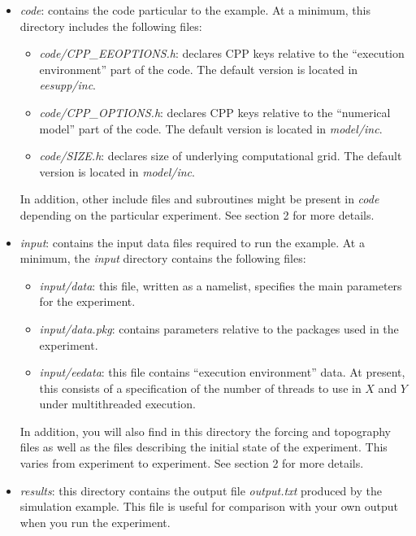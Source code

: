 \begin{itemize}
\item \textit{code}: contains the code particular to the example. At a
minimum, this directory includes the following files:

\begin{itemize}
\item \textit{code/CPP\_EEOPTIONS.h}: declares CPP keys relative to the
``execution environment'' part of the code. The default version is located
in \textit{eesupp/inc}.

\item \textit{code/CPP\_OPTIONS.h}: declares CPP keys relative to the
``numerical model'' part of the code. The default version is located in 
\textit{model/inc}.

\item \textit{code/SIZE.h}: declares size of underlying computational grid.
The default version is located in \textit{model/inc}.
\end{itemize}

In addition, other include files and subroutines might be present in \textit{%
code} depending on the particular experiment. See section 2 for more details.

\item \textit{input}: contains the input data files required to run the
example. At a minimum, the \textit{input} directory contains the following
files:

\begin{itemize}
\item \textit{input/data}: this file, written as a namelist, specifies the
main parameters for the experiment.

\item \textit{input/data.pkg}: contains parameters relative to the packages
used in the experiment.

\item \textit{input/eedata}: this file contains ``execution environment''
data. At present, this consists of a specification of the number of threads
to use in $X$ and $Y$ under multithreaded execution.
\end{itemize}

In addition, you will also find in this directory the forcing and topography
files as well as the files describing the initial state of the experiment.
This varies from experiment to experiment. See section 2 for more details.

\item \textit{results}: this directory contains the output file \textit{%
output.txt} produced by the simulation example. This file is useful for
comparison with your own output when you run the experiment.
\end{itemize}

